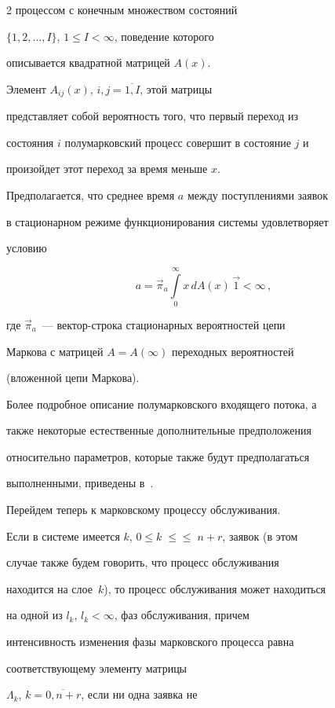 \begin{multicols}{2}
процессом с конечным множеством состояний


$\{1,2,\ldots,I\}$, $1\le I<\infty$, поведение которого


описывается квадратной матрицей $A(x)$.


Элемент $A_{ij}(x)$, $i,j=\overline{1,I}$, этой матрицы


представляет собой вероятность того, что первый переход из


состояния $i$ полумарковский процесс совершит в состояние $j$ и


произойдет этот переход за время меньше $x$.


Предполагается, что среднее время $a$ между поступлениями заявок


в стационарном режиме функционирования системы удовлетворяет


условию


$$


a = \vec\pi_a \int\limits_0^\infty x\, dA(x)\, \vec1 < \infty\,,


$$


где $\vec\pi_a$~--- вектор-строка стационарных вероятностей цепи


Маркова с матрицей $A=A(\infty)$ переходных вероятностей


(вложенной цепи Маркова).


Более подробное описание полумарковского входящего потока, а


также некоторые естественные дополнительные предположения


относительно параметров, которые также будут предполагаться


выполненными, приведены в~\cite{PC04}.





Перейдем теперь к марковскому процессу обслуживания.


Если в системе имеется $k$,  $0\le k\;\le$\linebreak $\le\;n+r$, заявок (в этом


случае также будем говорить, что процесс обслуживания


находится на слое~$k$), то процесс обслуживания может находиться


на одной из $l_k$, $l_k<\infty$, фаз обслуживания, причем


интенсивность изменения фазы марковского процесса равна


соответствующему элементу матрицы


$\Lambda_k$, $k=\overline{0,n+r}$, если ни одна заявка не



\end{multicols}
